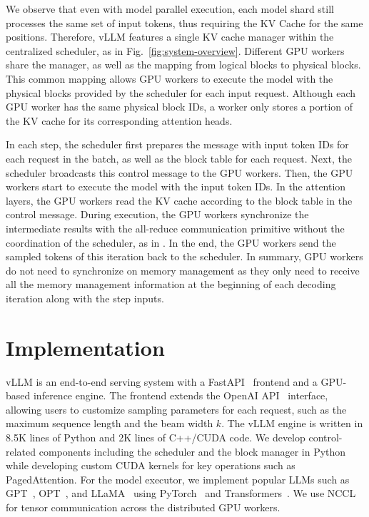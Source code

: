 We observe that even with model parallel execution, each model shard still processes the same set of input tokens, thus requiring the KV Cache for the same positions. Therefore, vLLM features a single KV cache manager within the centralized scheduler, as in Fig.~\ref{fig:system-overview}. Different GPU workers share the manager, as well as the mapping from logical blocks to physical blocks. This common mapping allows GPU workers to execute the model with the physical blocks provided by the scheduler for each input request. Although each GPU worker has the same physical block IDs, a worker only stores a portion of the KV cache for its corresponding attention heads.

In each step, the scheduler first prepares the message with input token IDs for each request in the batch, as well as the block table for each request. Next, the scheduler broadcasts this control message to the GPU workers. Then, the GPU workers start to execute the model with the input token IDs. In the attention layers, the GPU workers read the KV cache according to the block table in the control message. During execution, the GPU workers synchronize the intermediate results with the all-reduce communication primitive without the coordination of the scheduler, as in \cite{shoeybi2019megatron}. In the end, the GPU workers send the sampled tokens of this iteration back to the scheduler. In summary, GPU workers do not need to synchronize on memory management as they only need to receive all the memory management information at the beginning of each decoding iteration along with the step inputs.

\section{Implementation}
\label{sec:impl}

vLLM is an end-to-end serving system with a FastAPI~\cite{fastapi} frontend and a GPU-based inference engine. The frontend extends the OpenAI API~\cite{openaiapi} interface, allowing users to customize sampling parameters for each request, such as the maximum sequence length and the beam width $k$. The vLLM engine is written in 8.5K lines of Python and 2K lines of C++/CUDA code. We develop control-related components including the scheduler and the block manager in Python while developing custom CUDA kernels for key operations such as PagedAttention. For the model executor, we implement popular LLMs such as GPT~\cite{brown2020language}, OPT~\cite{zhang2022opt}, and LLaMA~\cite{touvron2023llama} using PyTorch~\cite{paszke2019pytorch} and Transformers~\cite{wolf2020transformers}. We use NCCL~\cite{nccl} for tensor communication across the distributed GPU workers.

